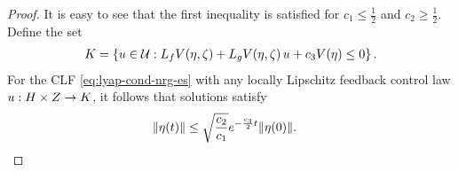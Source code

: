 \documentclass[twocolumn]{article}
\begin{document}
\begin{proof}
  It is easy to see that the first inequality is satisfied for $c_{1} \leq \frac{1}{2}$ and $c_{2} \geq \frac{1}{2}$.
  Define the set
  \begin{align}
    K = \left\{ u \in \mathcal{U} : L_{f} V(\eta, \zeta) + L_{g} V(\eta, \zeta) \, u + c_{3} V(\eta) \leq 0 \right\}.
    \label{eq:control-set}
  \end{align}
  For the CLF \eqref{eq:lyap-cond-nrg-es} with any locally Lipschitz feedback control law $u : H \times Z \to K$, it follows that solutions satisfy
  \begin{align*}
    \| \eta(t) \| \leq \sqrt{\frac{c_{2}}{c_{1}}} e^{-\frac{c_{3}}{2} t} \| \eta(0) \|. & \qedhere
  \end{align*}
  
\end{proof}
\end{document}
